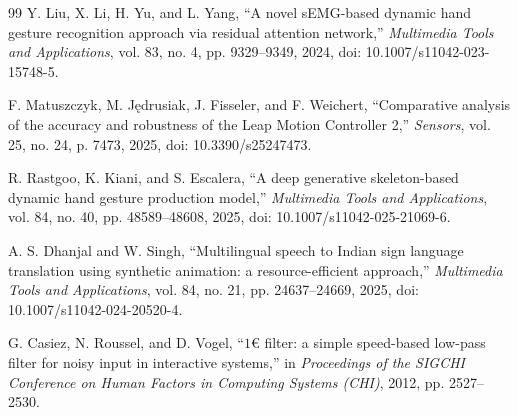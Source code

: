 \documentclass[10pt,twocolumn]{article}
\begin{document}
\begin{thebibliography}{99}
Y. Liu, X. Li, H. Yu, and L. Yang, ``A novel sEMG-based dynamic hand gesture recognition approach via residual attention network,'' \textit{Multimedia Tools and Applications}, vol. 83, no. 4, pp. 9329--9349, 2024, doi: 10.1007/s11042-023-15748-5.

F. Matuszczyk, M. J{\k{e}}drusiak, J. Fisseler, and F. Weichert, ``Comparative analysis of the accuracy and robustness of the Leap Motion Controller 2,'' \textit{Sensors}, vol. 25, no. 24, p. 7473, 2025, doi: 10.3390/s25247473.

R. Rastgoo, K. Kiani, and S. Escalera, ``A deep generative skeleton-based dynamic hand gesture production model,'' \textit{Multimedia Tools and Applications}, vol. 84, no. 40, pp. 48589--48608, 2025, doi: 10.1007/s11042-025-21069-6.

A. S. Dhanjal and W. Singh, ``Multilingual speech to Indian sign language translation using synthetic animation: a resource-efficient approach,'' \textit{Multimedia Tools and Applications}, vol. 84, no. 21, pp. 24637--24669, 2025, doi: 10.1007/s11042-024-20520-4.

G. Casiez, N. Roussel, and D. Vogel, ``$1\text{€}$ filter: a simple speed-based low-pass filter for noisy input in interactive systems,'' in \textit{Proceedings of the SIGCHI Conference on Human Factors in Computing Systems (CHI)}, 2012, pp. 2527--2530.

\end{thebibliography}
\end{document}
